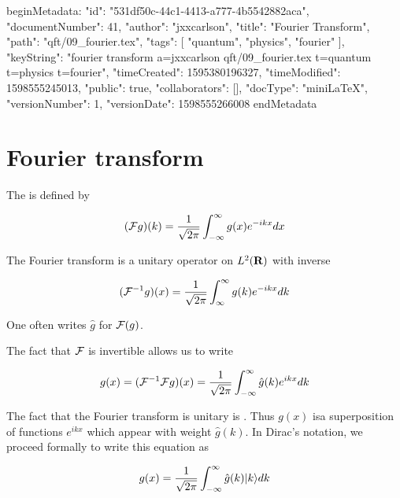 beginMetadata:
{
    "id": "531df50c-44c1-4413-a777-4b5542882aca",
    "documentNumber": 41,
    "author": "jxxcarlson",
    "title": "Fourier Transform",
    "path": "qft/09_fourier.tex",
    "tags": [
        "quantum",
        "physics",
        "fourier"
    ],
    "keyString": "fourier transform a=jxxcarlson qft/09_fourier.tex t=quantum t=physics t=fourier",
    "timeCreated": 1595380196327,
    "timeModified": 1598555245013,
    "public": true,
    "collaborators": [],
    "docType": "miniLaTeX",
    "versionNumber": 1,
    "versionDate": 1598555266008
}
endMetadata
\begin{mathmacro}
\newcommand{\bra}[0]{\langle}
\newcommand{\ket}[0]{\rangle}
\newcommand{\caF}[0]{\mathcal{F}}
\newcommand{\boR}[0]{\bf{R}}
\end{mathmacro}

\setcounter{section}{9}

\section{Fourier transform}


\innertableofcontents

The  is defined by

\begin{equation}
(\caF g )(k) = \frac{1}{\sqrt{2\pi}} \int_{-\infty}^\infty g(x) e^{-ikx} dx
\end{equation}

The Fourier transform is a unitary operator on $L^2(\boR )$ with inverse

\begin{equation}
(\caF^{-1} g)(x) =  \frac{1}{\sqrt{2\pi}} \int_{\infty}^\infty g(k) e^{-ikx} dk
\end{equation}

One often writes $\hat g$ for $\caF(g)$. 

The fact that $\caF$ is invertible allows us to write

\begin{equation}
g(x) = (\caF^{-1} \caF g)(x) =  \frac{1}{\sqrt{2\pi}}  \int_{-\infty}^\infty \hat g(k)  e^{ikx} dk
\end{equation}

The fact that the Fourier transform is unitary is .  Thus $g(x)$ 
isa superposition of  functions $e^{ikx}$ which appear with weight $\hat g(k)$.  In Dirac's notation, we proceed formally to write this equation as

\begin{equation}
g(x)  = \frac{1}{\sqrt{2\pi}} \int_{-\infty}^\infty \hat g(k) | k \ket dk
\end{equation}


